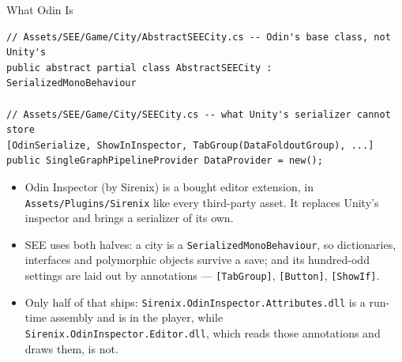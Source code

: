 \begin{frame}[fragile]{What Odin Is}
  \begin{lstlisting}[basicstyle=\scriptsize\ttfamily]
// Assets/SEE/Game/City/AbstractSEECity.cs -- Odin's base class, not Unity's
public abstract partial class AbstractSEECity : SerializedMonoBehaviour

// Assets/SEE/Game/City/SEECity.cs -- what Unity's serializer cannot store
[OdinSerialize, ShowInInspector, TabGroup(DataFoldoutGroup), ...]
public SingleGraphPipelineProvider DataProvider = new();
  \end{lstlisting}
  \vspace{1ex}

  \begin{itemize}
    \item Odin Inspector (by Sirenix) is a bought editor
      extension, in \texttt{Assets/Plugins/Sirenix} like every third-party
      asset. It replaces Unity's inspector and brings a serializer of its own.
    \item SEE uses both halves: a city is a \texttt{SerializedMonoBehaviour},
      so dictionaries, interfaces and polymorphic objects survive a save; and
      its hundred-odd settings are laid out by annotations ---
      \texttt{[TabGroup]}, \texttt{[Button]}, \texttt{[ShowIf]}.
    \item Only half of that ships:
      \texttt{Sirenix.OdinInspector.Attributes.dll} is a run-time assembly and
      is in the player, while \texttt{Sirenix.OdinInspector.Editor.dll}, which
      reads those annotations and draws them, is not.
  \end{itemize}
\end{frame}

